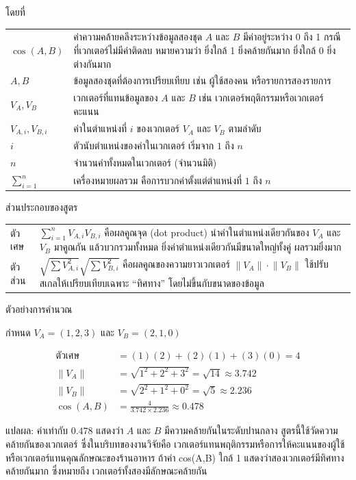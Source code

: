 \noindent โดยที่

\noindent
\begin{tabular}{@{}l @{\ :\ } p{}}
$\cos(A,B)$ & ค่าความคล้ายคลึงระหว่างข้อมูลสองชุด $A$ และ $B$ มีค่าอยู่ระหว่าง 0 ถึง 1 กรณีที่เวกเตอร์ไม่มีค่าติดลบ หมายความว่า ยิ่งใกล้ 1 ยิ่งคล้ายกันมาก ยิ่งใกล้ 0 ยิ่งต่างกันมาก \\
$A, B$ & ข้อมูลสองชุดที่ต้องการเปรียบเทียบ เช่น ผู้ใช้สองคน หรือรายการสองรายการ \\
$V_A, V_B$ & เวกเตอร์ที่แทนข้อมูลของ $A$ และ $B$ เช่น เวกเตอร์พฤติกรรมหรือเวกเตอร์คะแนน \\
$V_{A,i}, V_{B,i}$ & ค่าในตำแหน่งที่ $i$ ของเวกเตอร์ $V_A$ และ $V_B$ ตามลำดับ \\
$i$ & ตัวนับตำแหน่งของค่าในเวกเตอร์ เริ่มจาก $1$ ถึง $n$ \\
$n$ & จำนวนค่าทั้งหมดในเวกเตอร์ (จำนวนมิติ) \\
$\sum_{i=1}^{n}$ & เครื่องหมายผลรวม คือการบวกค่าตั้งแต่ตำแหน่งที่ $1$ ถึง $n$ \\
\end{tabular}

\bigskip
\noindent ส่วนประกอบของสูตร

\noindent
\begin{tabular}{@{}l @{\ :\ } p{}}
ตัวเศษ & $\sum_{i=1}^{n} V_{A,i}V_{B,i}$ คือผลคูณจุด (dot product) นำค่าในตำแหน่งเดียวกันของ $V_A$ และ $V_B$ มาคูณกัน แล้วบวกรวมทั้งหมด ยิ่งค่าตำแหน่งเดียวกันมีขนาดใหญ่ทั้งคู่ ผลรวมยิ่งมาก \\
ตัวส่วน & $\sqrt{\sum V_{A,i}^{2}}\sqrt{\sum V_{B,i}^{2}}$ คือผลคูณของความยาวเวกเตอร์ $\lVert V_A \rVert \cdot \lVert V_B \rVert$ ใช้ปรับสเกลให้เปรียบเทียบเฉพาะ ``ทิศทาง'' โดยไม่ขึ้นกับขนาดของข้อมูล \\
\end{tabular}

\bigskip
\noindent ตัวอย่างการคำนวณ

\noindent กำหนด $V_A = (1, 2, 3)$ และ $V_B = (2, 1, 0)$

\begin{align*}
\text{ตัวเศษ} &= (1)(2) + (2)(1) + (3)(0) = 4 \\
\lVert V_A \rVert &= \sqrt{1^2 + 2^2 + 3^2} = \sqrt{14} \approx 3.742 \\
\lVert V_B \rVert &= \sqrt{2^2 + 1^2 + 0^2} = \sqrt{5} \approx 2.236 \\
\cos(A,B) &= \frac{4}{3.742 \times 2.236} \approx 0.478
\end{align*}

\noindent แปลผล: ค่าเท่ากับ $0.478$ แสดงว่า $A$ และ $B$ มีความคล้ายกันในระดับปานกลาง
สูตรนี้ใช้วัดความคล้ายกันของเวกเตอร์ ซึ่งในบริบทของงานวิจัยคือ เวกเตอร์แทนพฤติกรรมหรือการให้คะแนนของผู้ใช้หรือเวกเตอร์แทนคุณลักษณะของร้านอาหาร ถ้าค่า cos(A,B) ใกล้ 1 แสดงว่าสองเวกเตอร์มีทิศทางคล้ายกันมาก ซึ่งหมายถึง เวกเตอร์ทั้งสองมีลักษณะคล้ายกัน \cite{hybrid_nd}


